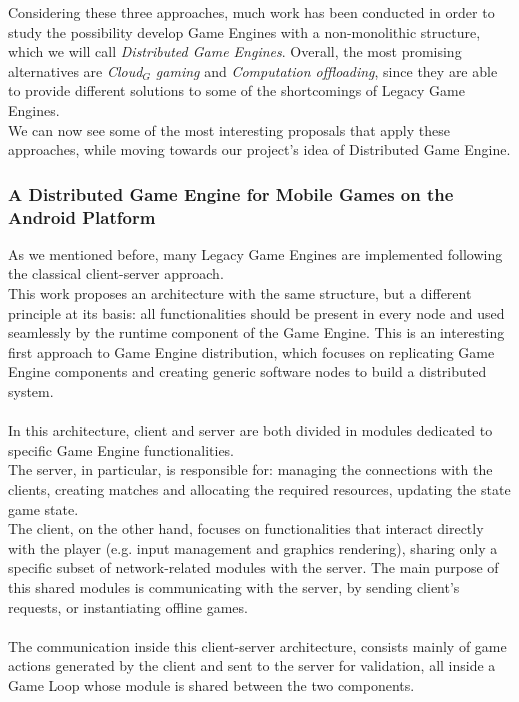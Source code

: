 Considering these three approaches, much work \cite{womak:distributed-architecture-interactive-multiplayer, womak:distributed-cloud-gaming-pipeline, womak:distributed-game-engine-android} has been conducted in order to study the possibility develop Game Engines with a non-monolithic structure, which we will call \textit{Distributed Game Engines}.
Overall, the most promising alternatives are \textit{Cloud$_G$ gaming} and \textit{Computation offloading}, since they are able to provide different solutions to some of the shortcomings of Legacy Game Engines. \\
We can now see some of the most interesting proposals that apply these approaches, while moving towards our project's idea of Distributed Game Engine.
\subsubsection{A Distributed Game Engine for Mobile Games on the Android Platform \cite{womak:distributed-game-engine-android}}
As we mentioned before, many Legacy Game Engines are implemented following the classical client-server approach. \\ 
This work proposes an architecture with the same structure, but a different principle at its basis: all functionalities should be present in every node and used seamlessly by the runtime component of the Game Engine. This is an interesting first approach to Game Engine distribution, which focuses on replicating Game Engine components and creating generic software nodes to build a distributed system. \\ \\
In this architecture, client and server are both divided in modules dedicated to specific Game Engine functionalities. \\ 
The server, in particular, is responsible for: managing the connections with the clients, creating matches and allocating the required resources, updating the state game state. \\
The client, on the other hand, focuses on functionalities that interact directly with the player (e.g. input management and graphics rendering), sharing only a specific subset of network-related modules with the server. The main purpose of this shared modules is communicating with the server, by sending client's requests, or instantiating offline games. \\ \\
The communication inside this client-server architecture, consists mainly of game actions generated by the client and sent to the server for validation, all inside a Game Loop whose module is shared between the two components.
